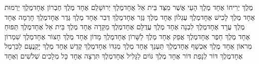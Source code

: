 \documentclass[../main/main.tex]{subfiles}
\begin{document}
\begin{multicols*}{\ncols}
מֶלֶךְ יְרִיחוֹ אֶחָד מֶלֶךְ הָעַי אֲשֶׁר מִצַּד בֵּית אֵל אֶחָד\PreVerseSpace{}מֶלֶךְ יְרוּשָׁלֵם אֶחָד מֶלֶךְ חֶבְרוֹן אֶחָד\PreVerseSpace{}מֶלֶךְ יַרְמוּת אֶחָד מֶלֶךְ לָכִישׁ אֶחָד\PreVerseSpace{}מֶלֶךְ עֶגְלוֹן אֶחָד מֶלֶךְ גֶּזֶר אֶחָד\PreVerseSpace{}מֶלֶךְ דְּבִר אֶחָד מֶלֶךְ גֶּדֶר אֶחָד\PreVerseSpace{}מֶלֶךְ חָרְמָה אֶחָד מֶלֶךְ עֲרָד אֶחָד\PreVerseSpace{}מֶלֶךְ לִבְנָה אֶחָד מֶלֶךְ עֲדֻלָּם אֶחָד\PreVerseSpace{}מֶלֶךְ מַקֵּדָה אֶחָד מֶלֶךְ בֵּית אֵל אֶחָד\PreVerseSpace{}מֶלֶךְ תַּפּוּחַ אֶחָד מֶלֶךְ חֵפֶר אֶחָד\PreVerseSpace{}מֶלֶךְ אֲפֵק אֶחָד מֶלֶךְ לַשָּׁרוֹן אֶחָד\PreVerseSpace{}מֶלֶךְ מָדוֹן אֶחָד מֶלֶךְ חָצוֹר אֶחָד\PreVerseSpace{}מֶלֶךְ שִׁמְרוֹן מְראוֹן אֶחָד מֶלֶךְ אַכְשָׁף אֶחָד\PreVerseSpace{}מֶלֶךְ תַּעְנַךְ אֶחָד מֶלֶךְ מְגִדּוֹ אֶחָד\PreVerseSpace{}מֶלֶךְ קֶדֶשׁ אֶחָד מֶלֶךְ יָקְנֳעָם לַכַּרְמֶל אֶחָד\PreVerseSpace{}מֶלֶךְ דּוֹר לְנָפַת דּוֹר אֶחָד מֶלֶךְ גּוֹיִם לַגָּלִיל\SubEnd{} אֶחָד\PreVerseSpace{}מֶלֶךְ תִּרְצָה אֶחָד כָּל מְלָכִים שְׁלֹשִׁים וְאֶחָד\OpenSection{}\par

\end{multicols*}
\end{document}
